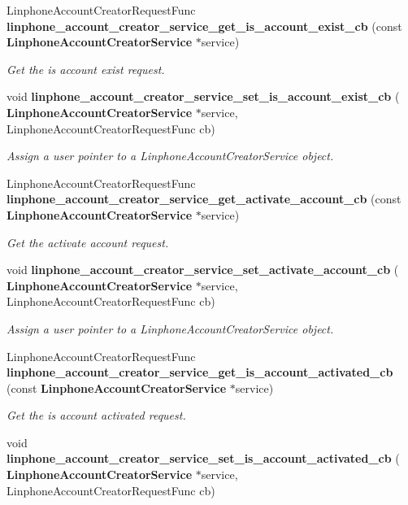 \begin{DoxyCompactItemize}
Linphone\+Account\+Creator\+Request\+Func \textbf{ linphone\+\_\+account\+\_\+creator\+\_\+service\+\_\+get\+\_\+is\+\_\+account\+\_\+exist\+\_\+cb} (const \textbf{ Linphone\+Account\+Creator\+Service} $\ast$service)
\begin{DoxyCompactList}\small\item\em Get the is account exist request. \end{DoxyCompactList}\item 
void \textbf{ linphone\+\_\+account\+\_\+creator\+\_\+service\+\_\+set\+\_\+is\+\_\+account\+\_\+exist\+\_\+cb} (\textbf{ Linphone\+Account\+Creator\+Service} $\ast$service, Linphone\+Account\+Creator\+Request\+Func cb)
\begin{DoxyCompactList}\small\item\em Assign a user pointer to a Linphone\+Account\+Creator\+Service object. \end{DoxyCompactList}\item 
Linphone\+Account\+Creator\+Request\+Func \textbf{ linphone\+\_\+account\+\_\+creator\+\_\+service\+\_\+get\+\_\+activate\+\_\+account\+\_\+cb} (const \textbf{ Linphone\+Account\+Creator\+Service} $\ast$service)
\begin{DoxyCompactList}\small\item\em Get the activate account request. \end{DoxyCompactList}\item 
void \textbf{ linphone\+\_\+account\+\_\+creator\+\_\+service\+\_\+set\+\_\+activate\+\_\+account\+\_\+cb} (\textbf{ Linphone\+Account\+Creator\+Service} $\ast$service, Linphone\+Account\+Creator\+Request\+Func cb)
\begin{DoxyCompactList}\small\item\em Assign a user pointer to a Linphone\+Account\+Creator\+Service object. \end{DoxyCompactList}\item 
Linphone\+Account\+Creator\+Request\+Func \textbf{ linphone\+\_\+account\+\_\+creator\+\_\+service\+\_\+get\+\_\+is\+\_\+account\+\_\+activated\+\_\+cb} (const \textbf{ Linphone\+Account\+Creator\+Service} $\ast$service)
\begin{DoxyCompactList}\small\item\em Get the is account activated request. \end{DoxyCompactList}\item 
void \textbf{ linphone\+\_\+account\+\_\+creator\+\_\+service\+\_\+set\+\_\+is\+\_\+account\+\_\+activated\+\_\+cb} (\textbf{ Linphone\+Account\+Creator\+Service} $\ast$service, Linphone\+Account\+Creator\+Request\+Func cb)

\end{DoxyCompactItemize}
